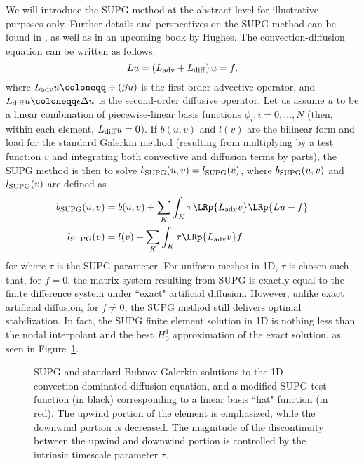 We will introduce the SUPG method at the abstract level for illustrative purposes only.  Further details and perspectives on the SUPG method can be found in \cite{SUPG}, as well as in an upcoming book by Hughes.  The convection-diffusion equation can be written as follows:
\[
Lu = \left(L_{\rm adv} + L_{\rm diff} \right) u = f,
\]
where $L_{\rm adv}u \coloneqq \div \left(\beta u\right)$ is the first order advective operator, and $L_{\rm diff}u \coloneqq \epsilon \Delta u$ is the second-order diffusive operator.  Let us assume $u$ to be a linear combination of piecewise-linear basis functions $\phi_i, i = 0,\ldots,N$ (then, within each element, $L_{\rm diff} u = 0$).  If $b(u,v)$ and $l(v)$ are the bilinear form and load for the standard Galerkin method (resulting from multiplying by a test function $v$ and integrating both convective and diffusion terms by parts), the SUPG method is then to solve $b_{\rm SUPG}(u,v) = l_{\rm SUPG}(v)$, where $b_{\rm SUPG}(u,v)$ and $l_{\rm SUPG}(v)$ are defined as
\begin{align*}
b_{\rm SUPG}(u,v) &= b(u,v)+ \sum_{K} \int_{K} \tau \LRp{L_{\rm adv} v} \LRp{L u - f} \\
l_{\rm SUPG}(v) &= l(v) + \sum_{K} \int_{K} \tau \LRp{L_{\rm adv}v} f
\end{align*}
for where $\tau$ is the SUPG parameter. For uniform meshes in 1D, $\tau$ is chosen such that, for $f=0$, the matrix system resulting from SUPG is exactly equal to the finite difference system under ``exact" artificial diffusion.  However, unlike exact artificial diffusion, for $f\neq 0$, the SUPG method still delivers optimal stabilization.  In fact, the SUPG finite element solution in 1D is nothing less than the nodal interpolant and the best $H^1_0$ approximation of the exact solution, as seen in Figure~\ref{fig:SUPG}.

\begin{figure}[!h]
\centering
{}
\caption{SUPG and standard Bubnov-Galerkin solutions to the 1D convection-dominated diffusion equation, and a modified SUPG test function (in black) corresponding to a linear basis ``hat" function (in red).  The upwind portion of the element is emphasized, while the downwind portion is decreased.  The magnitude of the discontinuity between the upwind and downwind portion is controlled by the intrinsic timescale parameter $\tau$. }
\label{fig:SUPG}
\end{figure}

